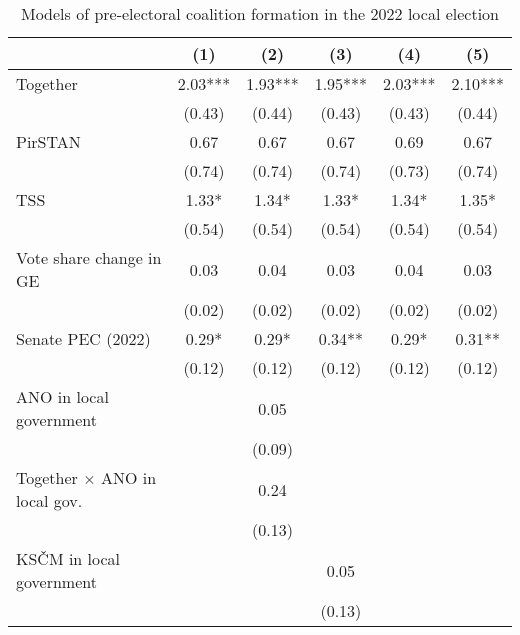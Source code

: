\begin{table}
\centering
\caption{Models of pre-electoral coalition formation in the 2022 local election \label{tab:2}}
\begin{tabular}[t]{lccccc}
\toprule
& (1) & (2) & (3) & (4) & (5) \\ \midrule 
Together                                & \num{2.03}***  & \num{1.93}***  & \num{1.95}***  & \num{2.03}***  & \num{2.10}***  \\
& (\num{0.43})   & (\num{0.44})   & (\num{0.43})   & (\num{0.43})   & (\num{0.44})   \\
PirSTAN                                 & \num{0.67}     & \num{0.67}     & \num{0.67}     & \num{0.69}     & \num{0.67}     \\
& (\num{0.74})   & (\num{0.74})   & (\num{0.74})   & (\num{0.73})   & (\num{0.74})   \\
TSS                                     & \num{1.33}*    & \num{1.34}*    & \num{1.33}*    & \num{1.34}*    & \num{1.35}*    \\
& (\num{0.54})   & (\num{0.54})   & (\num{0.54})   & (\num{0.54})   & (\num{0.54})   \\
Vote share change in GE                 & \num{0.03}    & \num{0.04}    & \num{0.03}    & \num{0.04}    & \num{0.03}     \\
& (\num{0.02})   & (\num{0.02})   & (\num{0.02})   & (\num{0.02})   & (\num{0.02})   \\
Senate PEC (2022)                       & \num{0.29}*    & \num{0.29}*    & \num{0.34}**   & \num{0.29}*    & \num{0.31}**   \\
& (\num{0.12})   & (\num{0.12})   & (\num{0.12})   & (\num{0.12})   & (\num{0.12})   \\
ANO in local government                 &                 & \num{0.05}     &                 &                 &                 \\
&                 & (\num{0.09})   &                 &                 &                 \\
Together × ANO in local gov.            &                 & \num{0.24}    &                 &                 &                 \\
&                 & (\num{0.13})   &                 &                 &                 \\
KSČM in local government                &                 &                 & \num{0.05}     &                 &                 \\
&                 &                 & (\num{0.13})   &                 &                 \\

\end{tabular}
\end{table}
